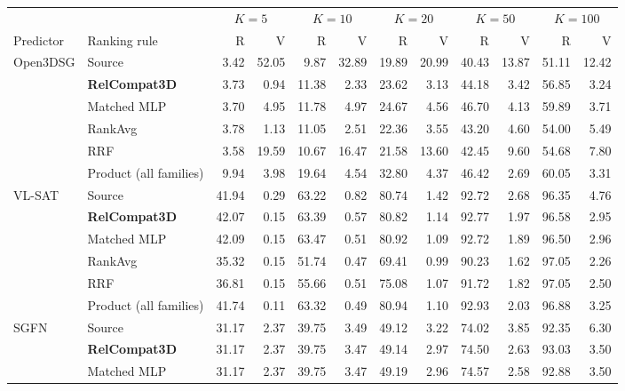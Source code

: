 \begin{table}[t]
\centering
{\small
\setlength{\tabcolsep}{2.0pt}
\begin{tabular}{@{}llrrrrrrrrrr@{}}
\toprule
& & \multicolumn{2}{c}{$K=5$} & \multicolumn{2}{c}{$K=10$} & \multicolumn{2}{c}{$K=20$} & \multicolumn{2}{c}{$K=50$} & \multicolumn{2}{c}{$K=100$} \\
\cmidrule(lr){3-4}\cmidrule(lr){5-6}\cmidrule(lr){7-8}\cmidrule(lr){9-10}\cmidrule(lr){11-12}
Predictor & Ranking rule & R & V & R & V & R & V & R & V & R & V \\
\midrule
\multirow{6}{*}{Open3DSG}
& Source & 3.42 & 52.05 & 9.87 & 32.89 & 19.89 & 20.99 & 40.43 & 13.87 & 51.11 & 12.42 \\
& \textbf{RelCompat3D} & 3.73 & 0.94 & 11.38 & 2.33 & 23.62 & 3.13 & 44.18 & 3.42 & 56.85 & 3.24 \\
& Matched MLP & 3.70 & 4.95 & 11.78 & 4.97 & 24.67 & 4.56 & 46.70 & 4.13 & 59.89 & 3.71 \\
& RankAvg & 3.78 & 1.13 & 11.05 & 2.51 & 22.36 & 3.55 & 43.20 & 4.60 & 54.00 & 5.49 \\
& RRF & 3.58 & 19.59 & 10.67 & 16.47 & 21.58 & 13.60 & 42.45 & 9.60 & 54.68 & 7.80 \\
& Product (all families) & 9.94 & 3.98 & 19.64 & 4.54 & 32.80 & 4.37 & 46.42 & 2.69 & 60.05 & 3.31 \\
\midrule
\multirow{6}{*}{VL-SAT}
& Source & 41.94 & 0.29 & 63.22 & 0.82 & 80.74 & 1.42 & 92.72 & 2.68 & 96.35 & 4.76 \\
& \textbf{RelCompat3D} & 42.07 & 0.15 & 63.39 & 0.57 & 80.82 & 1.14 & 92.77 & 1.97 & 96.58 & 2.95 \\
& Matched MLP & 42.09 & 0.15 & 63.47 & 0.51 & 80.92 & 1.09 & 92.72 & 1.89 & 96.50 & 2.96 \\
& RankAvg & 35.32 & 0.15 & 51.74 & 0.47 & 69.41 & 0.99 & 90.23 & 1.62 & 97.05 & 2.26 \\
& RRF & 36.81 & 0.15 & 55.66 & 0.51 & 75.08 & 1.07 & 91.72 & 1.82 & 97.05 & 2.50 \\
& Product (all families) & 41.74 & 0.11 & 63.32 & 0.49 & 80.94 & 1.10 & 92.93 & 2.03 & 96.88 & 3.25 \\
\midrule
\multirow{6}{*}{SGFN}
& Source & 31.17 & 2.37 & 39.75 & 3.49 & 49.12 & 3.22 & 74.02 & 3.85 & 92.35 & 6.30 \\
& \textbf{RelCompat3D} & 31.17 & 2.37 & 39.75 & 3.47 & 49.14 & 2.97 & 74.50 & 2.63 & 93.03 & 3.50 \\
& Matched MLP & 31.17 & 2.37 & 39.75 & 3.47 & 49.19 & 2.96 & 74.57 & 2.58 & 92.88 & 3.50 \\

\end{tabular}}
\end{table}

